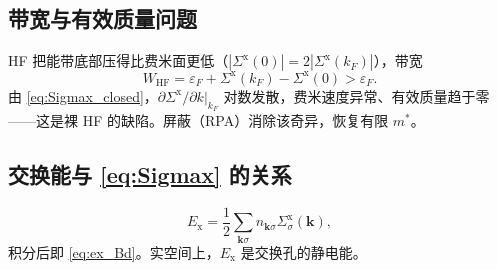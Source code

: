 \subsection{带宽与有效质量问题}

HF 把能带底部压得比费米面更低（$|\Sigma^{\mathrm{x}}(0)|=2|\Sigma^{\mathrm{x}}(k_F)|$），带宽
\begin{equation}
  W_{\mathrm{HF}}
  =\varepsilon_F+\Sigma^{\mathrm{x}}(k_F)-\Sigma^{\mathrm{x}}(0)
  >\varepsilon_F.
\end{equation}
由 \eqref{eq:Sigmax_closed}，$\partial\Sigma^{\mathrm{x}}/\partial k|_{k_F}$ 对数发散，费米速度异常、有效质量趋于零——这是裸 HF 的缺陷。屏蔽（RPA）消除该奇异，恢复有限 $m^*$。

\subsection{交换能与 \eqref{eq:Sigmax} 的关系}

\begin{equation}
  E_{\mathrm{x}}
  =\frac12\sum_{\mathbf{k}\sigma}
  n_{\mathbf{k}\sigma}\Sigma^{\mathrm{x}}_\sigma(\mathbf{k}),
\end{equation}
积分后即 \eqref{eq:ex_Bd}。实空间上，$E_{\mathrm{x}}$ 是交换孔的静电能。

